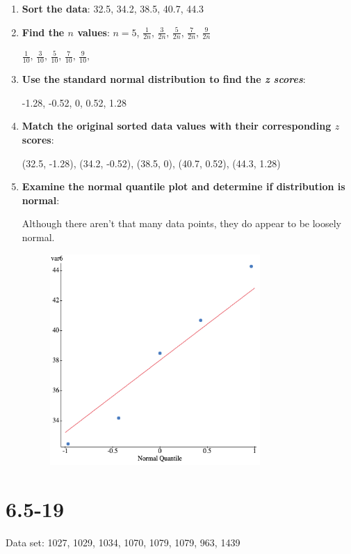 \documentclass[12pt,fleqn]{article}
\newcommand{\chapter}{6.5}
\newcommand{\problem}[1]{\vspace{5ex}\section*{\chapter-#1}}
\begin{document}
\begin{enumerate}
\item \textbf{Sort the data}: 32.5, 34.2, 38.5, 40.7, 44.3

\item \textbf{Find the $n$ values}:
  $n = 5$, $\frac{1}{2n} \text{, } \frac{3}{2n} \text{, } \frac{5}{2n} \text{, } \frac{7}{2n} \text{, } \frac{9}{2n}$

  $\frac{1}{10} \text{, } \frac{3}{10} \text{, } \frac{5}{10} \text{, } \frac{7}{10} \text{, } \frac{9}{10} \text{, } $

\item \textbf{Use the standard normal distribution to find the \textit{z scores}}:

  -1.28, -0.52, 0, 0.52, 1.28

\item \textbf{Match the original sorted data values with their corresponding $z$ scores}:

  (32.5, -1.28), (34.2, -0.52), (38.5, 0), (40.7, 0.52), (44.3, 1.28)

\item \textbf{Examine the normal quantile plot and determine if distribution is normal}:

Although there aren't that many data points, they do appear to be loosely normal.
\begin{figure}[ht]
  \centering
  \includegraphics[width=8cm]{assets/female-arms.png}
\end{figure}
\end{enumerate}


\problem{19}
Data set: 1027, 1029, 1034, 1070, 1079, 1079, 963, 1439
\end{document}
